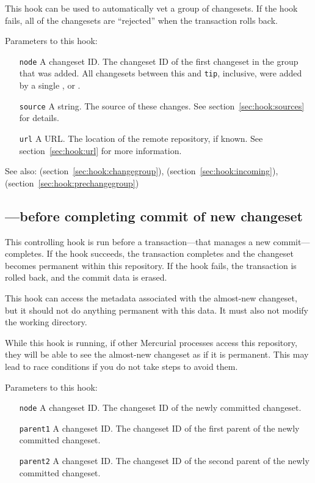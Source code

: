 This hook can be used to automatically vet a group of changesets.  If
the hook fails, all of the changesets are ``rejected'' when the
transaction rolls back.

Parameters to this hook:
\begin{itemize}
\item[\texttt{node}] A changeset ID.  The changeset ID of the first
  changeset in the group that was added.  All changesets between this
  and \texttt{tip}, inclusive, were added by
  a single ,  or .
\item[\texttt{source}] A string.  The source of these changes.  See
  section~\ref{sec:hook:sources} for details.
\item[\texttt{url}] A URL.  The location of the remote repository, if
  known.  See section~\ref{sec:hook:url} for more information.
\end{itemize}

See also:  (section~\ref{sec:hook:changegroup}),
 (section~\ref{sec:hook:incoming}),
 (section~\ref{sec:hook:prechangegroup})

\subsection{---before completing commit of new changeset}
\label{sec:hook:pretxncommit}

This controlling hook is run before a transaction---that manages a new
commit---completes.  If the hook succeeds, the transaction completes
and the changeset becomes permanent within this repository.  If the
hook fails, the transaction is rolled back, and the commit data is
erased.

This hook can access the metadata associated with the almost-new
changeset, but it should not do anything permanent with this data.  It
must also not modify the working directory.

While this hook is running, if other Mercurial processes access this
repository, they will be able to see the almost-new changeset as if it
is permanent.  This may lead to race conditions if you do not take
steps to avoid them.

Parameters to this hook:
\begin{itemize}
\item[\texttt{node}] A changeset ID.  The changeset ID of the newly
  committed changeset.
\item[\texttt{parent1}] A changeset ID.  The changeset ID of the first
  parent of the newly committed changeset.
\item[\texttt{parent2}] A changeset ID.  The changeset ID of the second
  parent of the newly committed changeset.
\end{itemize}

